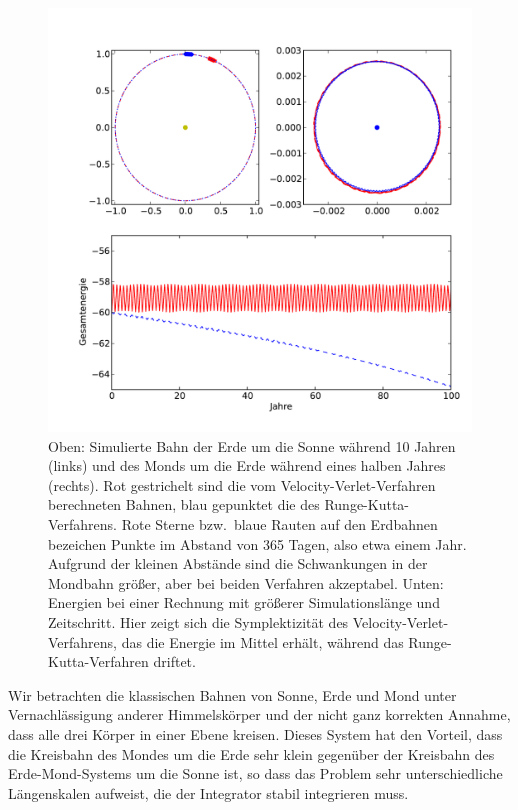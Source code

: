 \begin{figure}
  \centering
  \includegraphics[width=\textwidth]{plots/planets}
  \caption{Oben: Simulierte Bahn der Erde um die Sonne während 10
    Jahren (links) und des Monds um die Erde während eines halben
    Jahres (rechts). Rot gestrichelt sind die vom
    Velocity-Verlet-Verfahren berechneten Bahnen, blau gepunktet die
    des Runge-Kutta-Verfahrens. Rote Sterne bzw.\ blaue Rauten auf den
    Erdbahnen bezeichen Punkte im Abstand von 365 Tagen, also etwa
    einem Jahr. Aufgrund der kleinen Abstände sind die Schwankungen in
    der Mondbahn größer, aber bei beiden Verfahren akzeptabel. Unten:
    Energien bei einer Rechnung mit größerer Simulationslänge und
    Zeitschritt. Hier zeigt sich die Symplektizität des
    Velocity-Verlet-Verfahrens, das die Energie im Mittel erhält,
    während das Runge-Kutta-Verfahren driftet.}
  \label{fig:planets}
\end{figure}

Wir betrachten die klassischen Bahnen von Sonne, Erde und Mond unter
Vernachlässigung anderer Himmelskörper und der nicht ganz korrekten
Annahme, dass alle drei Körper in einer Ebene kreisen. Dieses System
hat den Vorteil, dass die Kreisbahn des Mondes um die Erde sehr klein
gegenüber der Kreisbahn des Erde-Mond-Systems um die Sonne ist, so
dass das Problem sehr unterschiedliche Längenskalen aufweist, die der
Integrator stabil integrieren muss.

